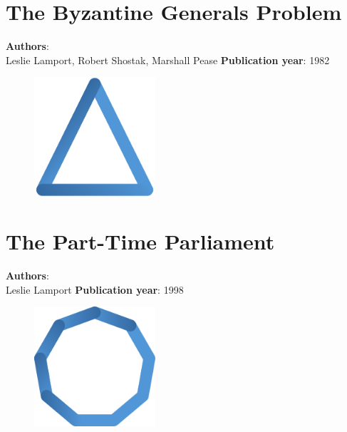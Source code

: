 \documentclass[11pt,fleqn]{book} %
\begin{document}
\chapter{The Byzantine Generals Problem}
\vspace*{-7mm}
\Large \textbf{Authors}: \\
Leslie Lamport, Robert Shostak, Marshall Pease
\newline\newline
\textbf{Publication year}: 1982
\begin{figure}[b]
    \centering
    \includegraphics[width=0.4\textwidth]{distributed-systems-triangle-blue.pdf}
\end{figure}


\chapter{The Part-Time Parliament}
\vspace*{-7mm}
\Large \textbf{Authors}: \\
Leslie Lamport
\newline\newline
\textbf{Publication year}: 1998
\begin{figure}[b]
    \centering
    \includegraphics[width=0.4\textwidth]{distributed-systems-blue.pdf}
\end{figure}

\end{document}
